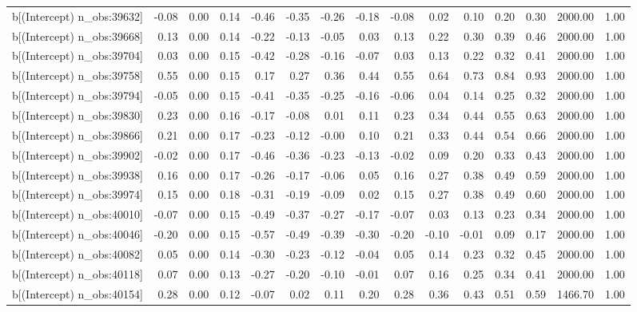 \begin{table}[ht]
\begin{tabular}{rrrrrrrrrrrrrrr}
  b[(Intercept) n\_obs:39632] & -0.08 & 0.00 & 0.14 & -0.46 & -0.35 & -0.26 & -0.18 & -0.08 & 0.02 & 0.10 & 0.20 & 0.30 & 2000.00 & 1.00 \\ 
  b[(Intercept) n\_obs:39668] & 0.13 & 0.00 & 0.14 & -0.22 & -0.13 & -0.05 & 0.03 & 0.13 & 0.22 & 0.30 & 0.39 & 0.46 & 2000.00 & 1.00 \\ 
  b[(Intercept) n\_obs:39704] & 0.03 & 0.00 & 0.15 & -0.42 & -0.28 & -0.16 & -0.07 & 0.03 & 0.13 & 0.22 & 0.32 & 0.41 & 2000.00 & 1.00 \\ 
  b[(Intercept) n\_obs:39758] & 0.55 & 0.00 & 0.15 & 0.17 & 0.27 & 0.36 & 0.44 & 0.55 & 0.64 & 0.73 & 0.84 & 0.93 & 2000.00 & 1.00 \\ 
  b[(Intercept) n\_obs:39794] & -0.05 & 0.00 & 0.15 & -0.41 & -0.35 & -0.25 & -0.16 & -0.06 & 0.04 & 0.14 & 0.25 & 0.32 & 2000.00 & 1.00 \\ 
  b[(Intercept) n\_obs:39830] & 0.23 & 0.00 & 0.16 & -0.17 & -0.08 & 0.01 & 0.11 & 0.23 & 0.34 & 0.44 & 0.55 & 0.63 & 2000.00 & 1.00 \\ 
  b[(Intercept) n\_obs:39866] & 0.21 & 0.00 & 0.17 & -0.23 & -0.12 & -0.00 & 0.10 & 0.21 & 0.33 & 0.44 & 0.54 & 0.66 & 2000.00 & 1.00 \\ 
  b[(Intercept) n\_obs:39902] & -0.02 & 0.00 & 0.17 & -0.46 & -0.36 & -0.23 & -0.13 & -0.02 & 0.09 & 0.20 & 0.33 & 0.43 & 2000.00 & 1.00 \\ 
  b[(Intercept) n\_obs:39938] & 0.16 & 0.00 & 0.17 & -0.26 & -0.17 & -0.06 & 0.05 & 0.16 & 0.27 & 0.38 & 0.49 & 0.59 & 2000.00 & 1.00 \\ 
  b[(Intercept) n\_obs:39974] & 0.15 & 0.00 & 0.18 & -0.31 & -0.19 & -0.09 & 0.02 & 0.15 & 0.27 & 0.38 & 0.49 & 0.60 & 2000.00 & 1.00 \\ 
  b[(Intercept) n\_obs:40010] & -0.07 & 0.00 & 0.15 & -0.49 & -0.37 & -0.27 & -0.17 & -0.07 & 0.03 & 0.13 & 0.23 & 0.34 & 2000.00 & 1.00 \\ 
  b[(Intercept) n\_obs:40046] & -0.20 & 0.00 & 0.15 & -0.57 & -0.49 & -0.39 & -0.30 & -0.20 & -0.10 & -0.01 & 0.09 & 0.17 & 2000.00 & 1.00 \\ 
  b[(Intercept) n\_obs:40082] & 0.05 & 0.00 & 0.14 & -0.30 & -0.23 & -0.12 & -0.04 & 0.05 & 0.14 & 0.23 & 0.32 & 0.45 & 2000.00 & 1.00 \\ 
  b[(Intercept) n\_obs:40118] & 0.07 & 0.00 & 0.13 & -0.27 & -0.20 & -0.10 & -0.01 & 0.07 & 0.16 & 0.25 & 0.34 & 0.41 & 2000.00 & 1.00 \\ 
  b[(Intercept) n\_obs:40154] & 0.28 & 0.00 & 0.12 & -0.07 & 0.02 & 0.11 & 0.20 & 0.28 & 0.36 & 0.43 & 0.51 & 0.59 & 1466.70 & 1.00 \\ 

\end{tabular}
\end{table}
